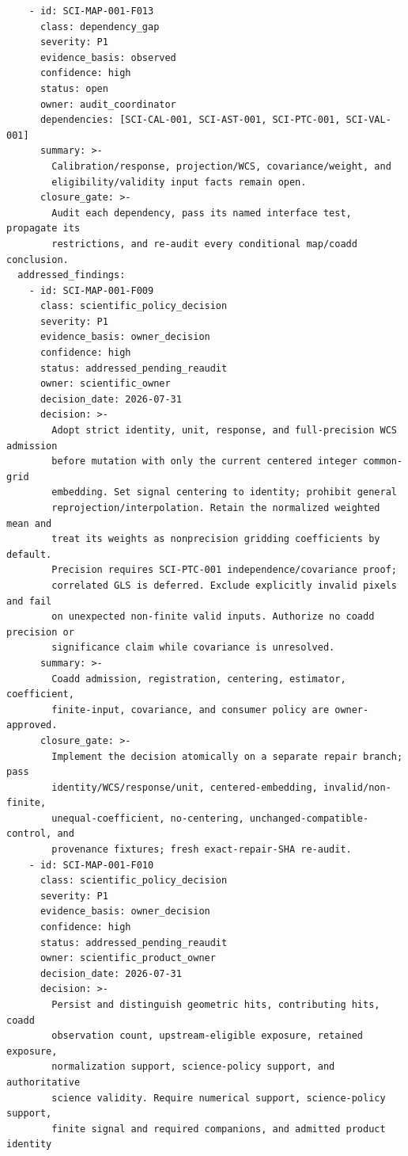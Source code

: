 \documentclass[11pt]{article}
\begin{document}
\begin{small}
\begin{verbatim}
    - id: SCI-MAP-001-F013
      class: dependency_gap
      severity: P1
      evidence_basis: observed
      confidence: high
      status: open
      owner: audit_coordinator
      dependencies: [SCI-CAL-001, SCI-AST-001, SCI-PTC-001, SCI-VAL-001]
      summary: >-
        Calibration/response, projection/WCS, covariance/weight, and
        eligibility/validity input facts remain open.
      closure_gate: >-
        Audit each dependency, pass its named interface test, propagate its
        restrictions, and re-audit every conditional map/coadd conclusion.
  addressed_findings:
    - id: SCI-MAP-001-F009
      class: scientific_policy_decision
      severity: P1
      evidence_basis: owner_decision
      confidence: high
      status: addressed_pending_reaudit
      owner: scientific_owner
      decision_date: 2026-07-31
      decision: >-
        Adopt strict identity, unit, response, and full-precision WCS admission
        before mutation with only the current centered integer common-grid
        embedding. Set signal centering to identity; prohibit general
        reprojection/interpolation. Retain the normalized weighted mean and
        treat its weights as nonprecision gridding coefficients by default.
        Precision requires SCI-PTC-001 independence/covariance proof;
        correlated GLS is deferred. Exclude explicitly invalid pixels and fail
        on unexpected non-finite valid inputs. Authorize no coadd precision or
        significance claim while covariance is unresolved.
      summary: >-
        Coadd admission, registration, centering, estimator, coefficient,
        finite-input, covariance, and consumer policy are owner-approved.
      closure_gate: >-
        Implement the decision atomically on a separate repair branch; pass
        identity/WCS/response/unit, centered-embedding, invalid/non-finite,
        unequal-coefficient, no-centering, unchanged-compatible-control, and
        provenance fixtures; fresh exact-repair-SHA re-audit.
    - id: SCI-MAP-001-F010
      class: scientific_policy_decision
      severity: P1
      evidence_basis: owner_decision
      confidence: high
      status: addressed_pending_reaudit
      owner: scientific_product_owner
      decision_date: 2026-07-31
      decision: >-
        Persist and distinguish geometric hits, contributing hits, coadd
        observation count, upstream-eligible exposure, retained exposure,
        normalization support, science-policy support, and authoritative
        science validity. Require numerical support, science-policy support,
        finite signal and required companions, and admitted product identity

\end{verbatim}
\end{small}
\end{document}
